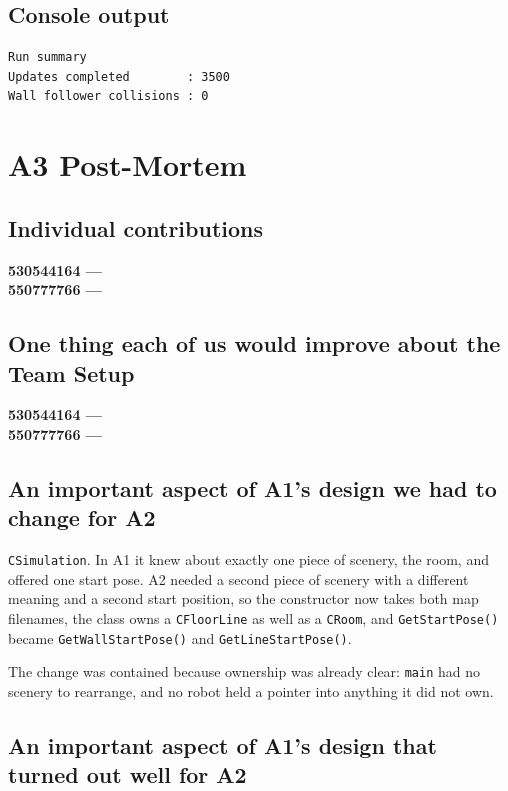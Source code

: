 \documentclass[10pt]{article}
\begin{document}
\subsection{Console output}

\begin{verbatim}
Run summary
Updates completed        : 3500
Wall follower collisions : 0
\end{verbatim}


\section{A3 Post-Mortem}

\subsection{Individual contributions}
\textbf{530544164 ---} %
\\[0.3cm]
\textbf{550777766 ---} %

\subsection{One thing each of us would improve about the Team Setup}
\textbf{530544164 ---} %
\\[0.3cm]
\textbf{550777766 ---} %

\subsection{An important aspect of A1's design we had to change for A2}

\texttt{CSimulation}. In A1 it knew about exactly one piece of scenery, the
room, and offered one start pose. A2 needed a second piece of scenery with a
different meaning and a second start position, so the constructor now takes
both map filenames, the class owns a \texttt{CFloorLine} as well as a
\texttt{CRoom}, and \texttt{GetStartPose()} became
\texttt{GetWallStartPose()} and \texttt{GetLineStartPose()}.

The change was contained because ownership was already clear: \texttt{main}
had no scenery to rearrange, and no robot held a pointer into anything it did
not own.

\subsection{An important aspect of A1's design that turned out well for A2}
\end{document}
